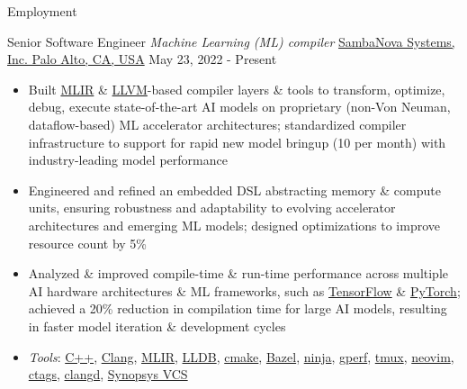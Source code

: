 \documentclass[]{mcdowellcv}
\begin{document}
\makeheader

\begin{cvsection}{Employment}
  \begin{cvsubsection}
    {Senior Software Engineer \linebreak \textit{Machine Learning (ML) compiler}}
    {\href{https://sambanova.ai/}{SambaNova Systems, Inc. \linebreak Palo Alto, CA, USA}}
    {May 23, 2022 - Present}
    \begin{itemize}
      \item
            Built \href{https://mlir.llvm.org/}{MLIR} \&
            \href{https://llvm.org/}{LLVM}-based compiler layers \& tools to
            transform, optimize, debug, execute state-of-the-art AI models on
            proprietary (non-Von Neuman, dataflow-based) ML accelerator
            architectures; standardized compiler infrastructure to support for
            rapid new model bringup (10 per month) with industry-leading model
            performance
      \item
            Engineered and refined an embedded DSL abstracting memory \&
            compute units, ensuring robustness and adaptability to evolving
            accelerator architectures and emerging ML models; designed
            optimizations to improve resource count by 5\%
      \item
            Analyzed \& improved compile-time \& run-time performance across
            multiple AI hardware architectures \& ML frameworks, such as
            \href{https://www.tensorflow.org/}{TensorFlow} \&
            \href{https://pytorch.org/}{PyTorch}; achieved a 20\% reduction in
            compilation time for large AI models, resulting in faster model
            iteration \& development cycles
      \item
            \textit{Tools}:
            \href{https://isocpp.org/}{C++},
            \href{https://clang.llvm.org/}{Clang},
            \href{https://mlir.llvm.org/}{MLIR},
            \href{https://lldb.llvm.org/}{LLDB},
            \href{https://cmake.org/}{cmake},
            \href{https://bazel.build/}{Bazel},
            \href{https://ninja-build.org/}{ninja},
            \href{https://gperftools.github.io/gperftools/cpuprofile.html}{gperf},
            \href{https://github.com/tmux/tmux}{tmux},
            \href{https://neovim.io/}{neovim},
            \href{https://github.com/universal-ctags/ctags}{ctags},
            \href{https://clangd.llvm.org/}{clangd},
            \href{https://www.synopsys.com/verification/simulation/vcs.html}{Synopsys VCS}
    \end{itemize}
  \end{cvsubsection}


\end{cvsection}
\end{document}
